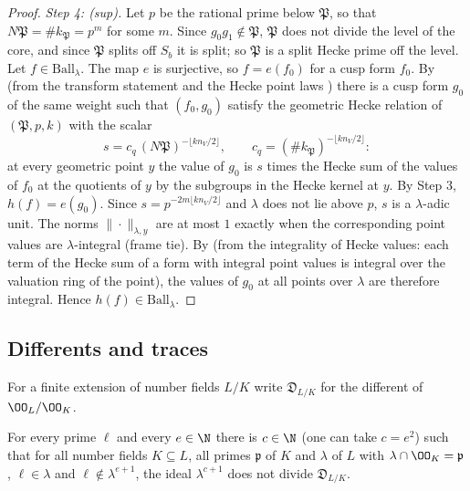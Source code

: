 \begin{proof}
\emph{Step 4: (sup).} Let $p$ be the rational prime below $\mathfrak P$, so that $N\mathfrak P=\#k_{\mathfrak P}=p^m$ for some $m$. Since
$g_0g_1\notin\mathfrak P$, $\mathfrak P$ does not divide the level of the core, and since $\mathfrak P$ splits off $S_b$ it is split; so $\mathfrak P$ is
a split Hecke prime off the level. Let $f\in\mathrm{Ball}_\lambda$. The map $e$ is surjective, so $f=e(f_0)$ for a cusp form
$f_0$. By  (from the transform statement and the Hecke point
laws ) there is a cusp form $g_0$ of the same weight such
that $(f_0,g_0)$ satisfy the geometric Hecke relation of $(\mathfrak P,p,k)$ with the scalar
\[
  s=c_q\,(N\mathfrak P)^{-\lfloor kn_V/2\rfloor},\qquad c_q=(\#k_{\mathfrak P})^{-\lfloor kn_V/2\rfloor}:
\]
at every geometric point $y$ the value of $g_0$ is $s$ times the Hecke sum of the values of $f_0$ at the
quotients of $y$ by the subgroups in the Hecke kernel at $y$. By Step 3, $h(f)=e(g_0)$. Since $s=p^{-2m\lfloor kn_V/2\rfloor}$
and $\lambda$ does not lie above $p$, $s$ is a $\lambda$-adic unit. The norms $\|\cdot\|_{\lambda,y}$ are at most $1$ exactly when the
corresponding point values are $\lambda$-integral (frame tie). By 
(from the integrality of Hecke values: each term of the Hecke sum of a form with integral point values is
integral over the valuation ring of the point), the values of $g_0$ at all points over $\lambda$ are therefore
integral. Hence $h(f)\in\mathrm{Ball}_\lambda$.
\end{proof}


\subsection{Differents and traces}\label{sec:pf:baselat2:diff}

For a finite extension of number fields $L/K$ write $\mathfrak D_{L/K}$ for the different of $\OO_L/\OO_K$.

\begin{theorem}\label{pf:baselat2:different}
For every prime $\ell$ and every $e\in\N$ there is $c\in\N$ (one can take $c=e^2$) such that for all number
fields $K\subseteq L$, all primes $\mathfrak p$ of $K$ and $\lambda$ of $L$ with $\lambda\cap\OO_K=\mathfrak p$,
$\ell\in\lambda$ and $\ell\notin\lambda^{e+1}$, the ideal $\lambda^{c+1}$ does not divide $\mathfrak D_{L/K}$.
\end{theorem}

